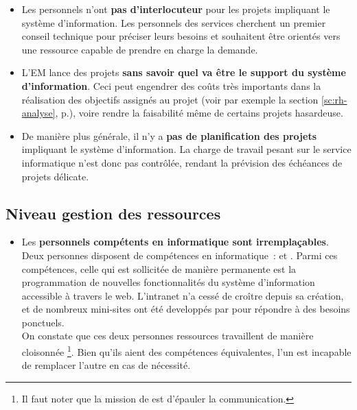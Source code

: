 \documentclass{book}
\begin{document}
\begin{itemize}
\item Les personnels n'ont \textbf{pas d'interlocuteur} pour les projets impliquant le système 
	d'information. Les personnels des services cherchent un premier conseil technique
	pour préciser leurs besoins et souhaitent être orientés vers une ressource
	capable de prendre en charge la demande.\\

\item L'EM lance des projets \textbf{sans savoir quel va être le support du système d'information}.
	Ceci peut engendrer des coûts très importants dans la réalisation des objectifs
	assignés au projet (voir par exemple la section \ref{sc:rh-analyse}, p.\pageref{sc:rh-analyse}),
	voire rendre la faisabilité même de certains projets hasardeuse.\\

\item De manière plus générale, il n'y a \textbf{pas de planification des projets} impliquant le 
	système d'information. La charge de travail pesant sur le service informatique n'est donc
	pas contrôlée, rendant la prévision des échéances de projets délicate.\\
\end{itemize}


\subsection{Niveau gestion des ressources}

\begin{itemize}
\item Les \textbf{personnels compétents en informatique sont irremplaçables}.
Deux personnes disposent de compétences en informatique~: \CK et \NB. Parmi
ces compétences, celle qui est sollicitée de manière permanente est la programmation
de nouvelles fonctionnalités du système d'information accessible à travers le web.
L'intranet n'a cessé de croître depuis sa création, et de nombreux mini-sites ont 
été developpés par \NB pour répondre à des besoins ponctuels.\\

On constate que ces deux personnes ressources travaillent de manière cloisonnée%
\footnote{Il faut noter que la mission de \NB est d'épauler la communication.}.
Bien qu'ils aient des compétences équivalentes, l'un est incapable de 
remplacer l'autre en cas de nécessité.
\end{itemize}
\end{document}
